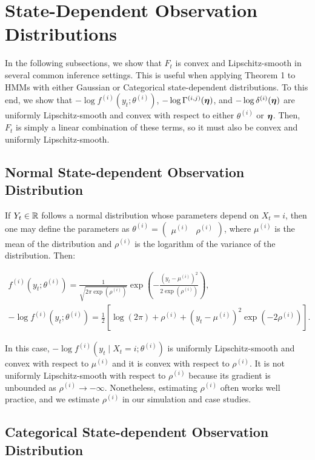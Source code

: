 \section{State-Dependent Observation Distributions}

In the following subsections, we show that $F_t$ is convex and Lipschitz-smooth in several common inference settings. This is useful when applying Theorem 1 to HMMs with either Gaussian or Categorical state-dependent distributions. To this end, we show that $-\log f^{(i)}(y_t ; \theta^{(i)})$, $-\log \Gamma^{(i,j)}(\boldsymbol{\eta})$, and $-\log \delta^{(i)}(\boldsymbol{\eta})$ are uniformly Lipschitz-smooth and convex with respect to either $\theta^{(i)}$ or $\boldsymbol{\eta}$. Then, $F_t$ is simply a linear combination of these terms, so it must also be convex and uniformly Lipschitz-smooth.

\subsection{Normal State-dependent Observation Distribution}

If $Y_t \in \mathbb{R}$ follows a normal distribution whose parameters depend on $X_t = i$, then one may define the parameters as $\theta^{(i)} = \begin{pmatrix} \mu^{(i)} & \rho^{(i)} \end{pmatrix}$, where $\mu^{(i)}$ is the mean of the distribution and $\rho^{(i)}$ is the logarithm of the variance of the distribution. Then:

\begin{gather}
    f^{(i)}(y_t ; \theta^{(i)}) = \frac{1}{\sqrt{2\pi\exp(\rho^{(i)})}} \exp\left(-\frac{\left(y_t - \mu^{(i)}\right)^2}{2 \exp(\rho^{(i)})}\right), \\
    - \log f^{(i)}(y_t ; \theta^{(i)}) = \frac{1}{2}\left[\log(2\pi) + \rho^{(i)} + \left(y_t - \mu^{(i)}\right)^2 \exp(-2\rho^{(i)})\right].
\end{gather}

In this case, $-\log f^{(i)}(y_t \mid X_t = i ; \theta^{(i)})$ is uniformly Lipschitz-smooth and convex with respect to $\mu^{(i)}$ and it is convex with respect to $\rho^{(i)}$. It is not uniformly Lipschitz-smooth with respect to $\rho^{(i)}$ because its gradient is unbounded as $\rho^{(i)} \to -\infty$. Nonetheless, estimating $\rho^{(i)}$ often works well practice, and we estimate $\rho^{(i)}$ in our simulation and case studies.
    
\subsection{Categorical State-dependent Observation Distribution}

